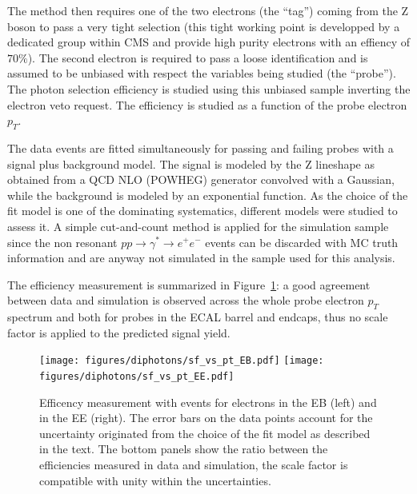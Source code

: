 The method then requires one of the two electrons (the ``tag'') coming from the Z boson to pass a very tight selection
(this tight working point is developped by a dedicated group within CMS and provide high purity electrons
with an effiency of $70\%$).
The second electron is required to pass a loose identification and is assumed to be unbiased
with respect the variables being studied (the ``probe''). The photon selection efficiency is studied using
this unbiased sample inverting the electron veto request.
The efficiency is studied as a function of the probe electron $p_T$.

The data  events are fitted
simultaneously for passing and failing probes with a signal plus background model.
The signal is modeled by the Z lineshape as obtained from a QCD NLO (POWHEG)
generator convolved with a Gaussian, while the background is modeled by an exponential function. As
the choice of the fit model is one of the dominating systematics, different models were
studied to assess it. A simple cut-and-count method is applied for the simulation sample
since the non resonant $pp \to \gamma^* \to e^+e^-$ events can be discarded with MC truth information and
are anyway not simulated in the sample used for this analysis.

The efficiency measurement is summarized in Figure~\ref{fig:tnp}: a good agreement between data and simulation is
observed across the whole probe electron $p_T$ spectrum and both for probes in the  ECAL barrel and endcaps, thus no scale factor
is applied to the predicted signal yield.

\begin{figure}
  \centering
  \texttt{[image: figures/diphotons/sf\_vs\_pt\_EB.pdf]}
  \texttt{[image: figures/diphotons/sf\_vs\_pt\_EE.pdf]}
  \caption{Efficency measurement with \Zee events for electrons in the EB (left) and in the EE (right).
    The error bars on the data points
    account for the uncertainty originated from the choice of the fit model as described in the text.
    The bottom panels show the ratio between the efficiencies measured in data and simulation, the scale factor is
    compatible with unity within the uncertainties.}
  \label{fig:tnp}    
\end{figure}


